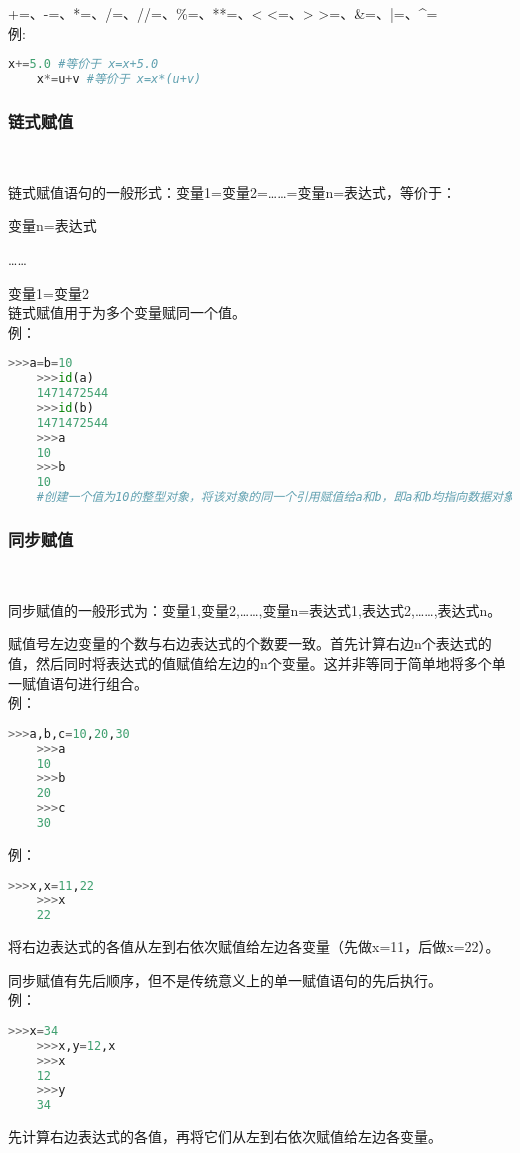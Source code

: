 \documentclass[11pt,a4paper]{article}
\begin{document}
+=、-=、*=、/=、//=、\%=、**=、<  <=、> >=、\&=、|=、\^{}=\\
例:
\begin{lstlisting}[language={Python}]
    x+=5.0 #等价于 x=x+5.0
    x*=u+v #等价于 x=x*(u+v)
\end{lstlisting}

\subsubsection{链式赋值}~{}

链式赋值语句的一般形式：变量1=变量2=……=变量n=表达式，等价于：

变量n=表达式

……

变量1=变量2\\
链式赋值用于为多个变量赋同一个值。\\
例：
\begin{lstlisting}[language={Python}]
    >>>a=b=10
    >>>id(a)
    1471472544
    >>>id(b)
    1471472544
    >>>a
    10
    >>>b
    10
    #创建一个值为10的整型对象，将该对象的同一个引用赋值给a和b，即a和b均指向数据对象10
\end{lstlisting}


\subsubsection{同步赋值}~{}

同步赋值的一般形式为：变量1,变量2,……,变量n=表达式1,表达式2,……,表达式n。

赋值号左边变量的个数与右边表达式的个数要一致。首先计算右边n个表达式的值，然后同时将表达式的值赋值给左边的n个变量。这并非等同于简单地将多个单一赋值语句进行组合。\\
例：
\begin{lstlisting}[language={Python}]
    >>>a,b,c=10,20,30
    >>>a
    10
    >>>b
    20
    >>>c
    30  
\end{lstlisting}
例：
\begin{lstlisting}[language={Python}]
    >>>x,x=11,22
    >>>x
    22
\end{lstlisting}
将右边表达式的各值从左到右依次赋值给左边各变量（先做x=11，后做x=22）。

同步赋值有先后顺序，但不是传统意义上的单一赋值语句的先后执行。\\
例：
\begin{lstlisting}[language={Python}]
    >>>x=34
    >>>x,y=12,x
    >>>x
    12
    >>>y
    34
\end{lstlisting}
先计算右边表达式的各值，再将它们从左到右依次赋值给左边各变量。
\end{document}
